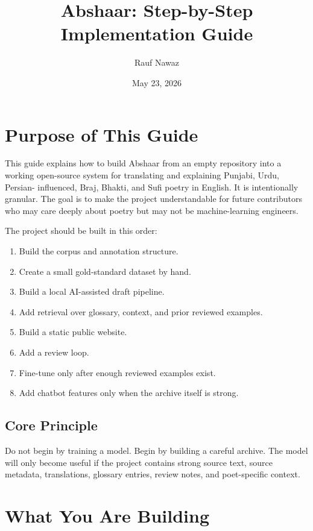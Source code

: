 \documentclass[11pt]{article}
\title{Abshaar: Step-by-Step Implementation Guide}
\author{Rauf Nawaz}
\date{May 23, 2026}
\begin{document}
\maketitle
\tableofcontents
\newpage

\section{Purpose of This Guide}

This guide explains how to build Abshaar from an empty repository into a working
open-source system for translating and explaining Punjabi, Urdu, Persian-
influenced, Braj, Bhakti, and Sufi poetry in English. It is intentionally
granular. The goal is to make the project understandable for future contributors
who may care deeply about poetry but may not be machine-learning engineers.

The project should be built in this order:

\begin{enumerate}
  \item Build the corpus and annotation structure.
  \item Create a small gold-standard dataset by hand.
  \item Build a local AI-assisted draft pipeline.
  \item Add retrieval over glossary, context, and prior reviewed examples.
  \item Build a static public website.
  \item Add a review loop.
  \item Fine-tune only after enough reviewed examples exist.
  \item Add chatbot features only when the archive itself is strong.
\end{enumerate}

\subsection{Core Principle}

Do not begin by training a model. Begin by building a careful archive. The model
will only become useful if the project contains strong source text, source
metadata, translations, glossary entries, review notes, and poet-specific
context.

\section{What You Are Building}
\end{document}
